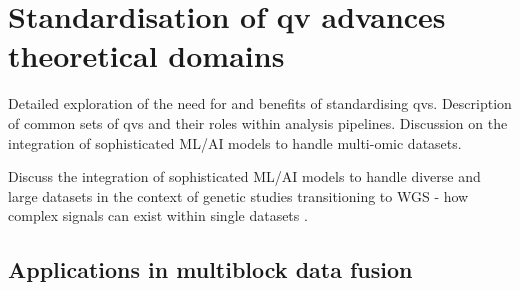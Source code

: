 \begin{tcolorbox}[
    breakable,  %
    colback=white!0,  %
    colframe=black,  %
    boxrule=1pt,  %
    arc=1mm,  %
    outer arc=1mm,
    title=\textbf{\refstepcounter{myboxcounter}\label{box:qv_bash_code_example}Box \themyboxcounter: Example code sourcing the variables file}
]


\end{tcolorbox}


\section{Standardisation of \ac{qv} advances theoretical domains}
Detailed exploration of the need for and benefits of standardising \ac{qv}s. 
Description of common sets of \ac{qv}s and their roles within analysis pipelines. 
Discussion on the integration of sophisticated ML/AI models to handle multi-omic datasets.

Discuss the integration of sophisticated ML/AI models to handle diverse and large datasets in the context of genetic studies transitioning to WGS - how complex signals can exist within single datasets
\cite{kong2018nature, howe2021within}.

\subsection{Applications in multiblock data fusion} 

